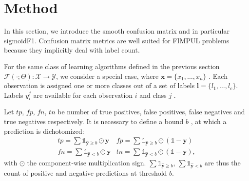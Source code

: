 
\section{Method}
\label{sec:orga8a42f5}
\label{section:method}

In this section, we introduce the smooth confusion matrix and in particular sigmoidF1. Confusion matrix metrics are well suited for FIMPUL problems because they implicitly deal with label count. 


For the same class of learning algorithms defined in the previous section \(\mathcal{F}(\cdot ; \Theta): \mathcal{X} \rightarrow \mathcal{Y}\), we consider a special case, where \(\mathbf{x} = \{x_1, \ldots, x_n\}\) . Each observation is assigned one or more classes out of a set of labels \(\mathbf{l} = \{l_1, \ldots, l_c\}\). Labels \(y_{i}^{j}\) are available for each observation \(i\) and class \(j\) . 




Let \(tp\), \(fp\), \(fn\), \(tn\) be number of true positives, false positives, false negatives and true negatives respectively. It is necessary to define a bound \(b\) , at which a prediction is dichotomized:
%
\begin{equation}
\label{eq:conf}
\begin{array}{ll} tp = \sum \mathds{1}_{\hat{\mathbf{y}} \geq b} \odot \mathbf{y}  & fp = \sum \mathds{1}_{\hat{\mathbf{y}} \geq b} \odot (\mathds{1} - \mathbf{y}) \\ fn = \sum \mathds{1}_{\hat{\mathbf{y}} < b} \odot \mathbf{y} & tn = \sum \mathds{1}_{\hat{\mathbf{y}} < b} \odot (\mathds{1} - \mathbf{y}),
\end{array}
\end{equation}
%
with \(\odot\) the component-wise multiplication sign. \(\sum \mathds{1}_{\hat{\mathbf{y}} \geq b}\), \(\sum \mathds{1}_{\hat{\mathbf{y}} < b}\) are thus the count of positive and negative predictions at threshold \(b\).

